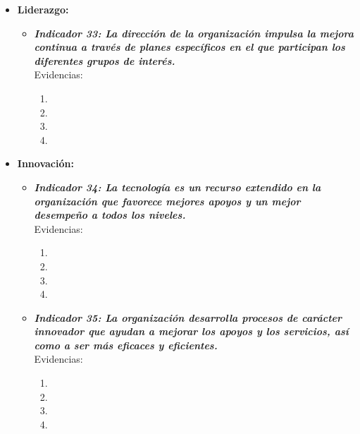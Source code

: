 \begin{itemize}
\begin{itemize}
\begin{itemize}
			\begin{enumerate}
				\item 
				\item 
				\item 
				\item 
			\end{enumerate}
		\end{itemize}

		\item \textbf{Liderazgo:}
		\begin{itemize}
			\item \textbf{\textit{Indicador 33: La dirección de la organización impulsa la mejora continua a través de planes específicos en el que participan los diferentes grupos de interés.}}\\Evidencias:
			
			\begin{enumerate}
				\item 
				\item 
				\item 
				\item 
			\end{enumerate} 
		\end{itemize}

		\item \textbf{Innovación:}
		\begin{itemize}
			\item \textbf{\textit{Indicador 34: La tecnología es un recurso extendido en la organización que favorece mejores apoyos y un mejor desempeño a todos los niveles.}}\\Evidencias:
			
			\begin{enumerate}
				\item 
				\item 
				\item 
				\item 
			\end{enumerate} 

			\item \textbf{\textit{Indicador 35: La organización desarrolla procesos de carácter innovador que ayudan a mejorar los apoyos y los servicios, así como a ser más eficaces y eficientes.}}\\Evidencias:
			
			\begin{enumerate}
				\item 
				\item 
				\item 
				\item 
			\end{enumerate}
		\end{itemize}
	\end{itemize}


\end{itemize}
